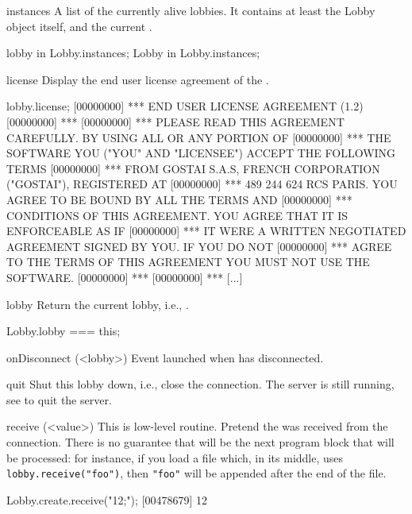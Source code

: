 \begin{urbiscriptapi}
\item[instances]
  A list of the currently alive lobbies.  It contains at least the Lobby
  object itself, and the current .
\begin{urbiassert}
lobby in Lobby.instances;
Lobby in Lobby.instances;
\end{urbiassert}

\item[license]
  Display the end user license agreement of the \usdk.
\begin{urbiunchecked}
lobby.license;
[00000000] *** END USER LICENSE AGREEMENT (1.2)
[00000000] ***
[00000000] *** PLEASE READ THIS AGREEMENT CAREFULLY.  BY USING ALL OR ANY PORTION OF
[00000000] *** THE SOFTWARE YOU ("YOU" AND "LICENSEE") ACCEPT THE FOLLOWING TERMS
[00000000] *** FROM GOSTAI S.A.S, FRENCH CORPORATION ("GOSTAI"), REGISTERED AT
[00000000] *** 489 244 624 RCS PARIS.  YOU AGREE TO BE BOUND BY ALL THE TERMS AND
[00000000] *** CONDITIONS OF THIS AGREEMENT.  YOU AGREE THAT IT IS ENFORCEABLE AS IF
[00000000] *** IT WERE A WRITTEN NEGOTIATED AGREEMENT SIGNED BY YOU.  IF YOU DO NOT
[00000000] *** AGREE TO THE TERMS OF THIS AGREEMENT YOU MUST NOT USE THE SOFTWARE.
[00000000] ***
[00000000] *** [...]
\end{urbiunchecked}

\item[lobby]
  Return the current lobby, i.e., \this.
\begin{urbiassert}
Lobby.lobby === this;
\end{urbiassert}

\item[onDisconnect](<lobby>)%
  Event launched when \this has disconnected.

\item[quit] Shut this lobby down, i.e., close the connection.  The
  server is still running, see  to quit the
  server.

\item[receive](<value>)%
  This is low-level routine.  Pretend the 
   was received from the connection.  There is no guarantee
  that  will be the next program block that will be
  processed: for instance, if you load a file which, in its middle,
  uses \lstinline|lobby.receive("foo")|, then \lstinline|"foo"| will
  be appended after the end of the file.
\begin{urbiscript}
Lobby.create.receive("12;");
[00478679] 12
\end{urbiscript}


\end{urbiscriptapi}
